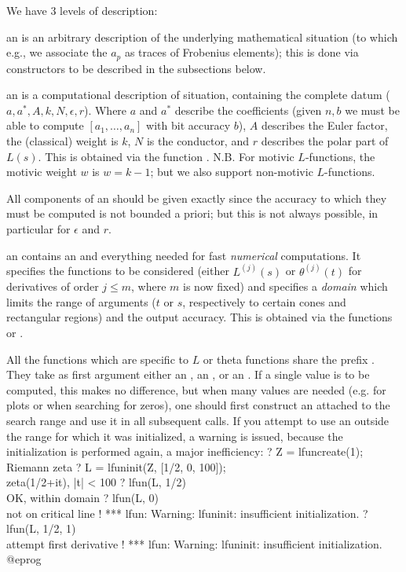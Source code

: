 
We have 3 levels of description:

\item an  is an arbitrary description of the underlying
mathematical situation (to which e.g., we associate the $a_p$ as traces of
Frobenius elements); this is done via constructors to be described in the
subsections below.

\item an  is a computational description of situation, containing
the complete datum ($a,a^*,A,k,N,\epsilon,r$). Where $a$ and $a^*$ describe
the coefficients (given $n,b$ we must be able to compute $[a_1,\dots,a_n]$
with bit accuracy $b$), $A$ describes the Euler factor, the (classical) weight
is $k$, $N$ is the conductor, and $r$ describes the polar part of $L(s)$.
This is obtained via the function . N.B. For motivic
$L$-functions, the motivic weight $w$ is $w = k-1$; but we also support
non-motivic $L$-functions.

 All components of an  should be given
exactly since the accuracy to which they must be computed is not bounded a
priori; but this is not always possible, in particular for $\epsilon$ and $r$.

\item an  contains an  and everything needed for fast
\emph{numerical} computations. It specifies the functions to be considered
(either $L^{(j)}(s)$ or $\theta^{(j)}(t)$ for derivatives of order $j \leq
m$, where $m$ is now fixed) and specifies a \emph{domain} which limits
the range of arguments ($t$ or $s$, respectively to certain cones and
rectangular regions) and the output accuracy. This is obtained via the
functions  or .

All the functions which are specific to $L$ or theta functions share the
prefix . They take as first argument either an , an
, or an . If a single value is to be computed,
this makes no difference, but when many values are needed (e.g. for plots or
when searching for zeros), one should first construct an 
attached to the search range and use it in all subsequent calls.
If you attempt to use an  outside the range for which it was
initialized, a warning is issued, because the initialization is
performed again, a major inefficiency:
\bprog
? Z = lfuncreate(1); \\ Riemann zeta
? L = lfuninit(Z, [1/2, 0, 100]); \\ zeta(1/2+it), |t| < 100
? lfun(L, 1/2)    \\ OK, within domain
? lfun(L, 0)      \\ not on critical line !
  *** lfun: Warning: lfuninit: insufficient initialization.
? lfun(L, 1/2, 1) \\ attempt first derivative !
*** lfun: Warning: lfuninit: insufficient initialization.
@eprog

